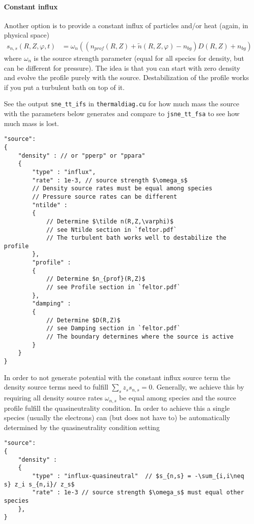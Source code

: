 \paragraph{Constant influx}
Another option is to provide a constant influx of particles and/or heat (again, in physical space)
\begin{align}
    s_{n,s}(R,Z,\varphi, t) &= \omega_n \left( (n_{prof}(R,Z) + \tilde n(R,Z,\varphi) - n_{bg})D(R,Z) + n_{bg}\right)
\end{align}
where $\omega_n$ is the source strength parameter (equal for all species for density, but can be different for pressure).
The idea is that you can start with zero density and evolve the profile purely
with the source. Destabilization of the profile works if you put a turbulent
bath on top of it.
\begin{tcolorbox}[title=Note]
    See the output \texttt{sne_tt_ifs} in \texttt{thermaldiag.cu} for how much mass
the source with the parameters below generates and compare to
\texttt{jsne_tt_fsa} to see how much mass is lost.
\end{tcolorbox}
\begin{verbatim}
"source":
{
    "density" : // or "pperp" or "ppara"
    {
        "type" : "influx",
        "rate" : 1e-3, // source strength $\omega_s$
        // Density source rates must be equal among species
        // Pressure source rates can be different
        "ntilde" :
        {
            // Determine $\tilde n(R,Z,\varphi)$
            // see Ntilde section in `feltor.pdf`
            // The turbulent bath works well to destabilize the profile
        },
        "profile" :
        {
            // Determine $n_{prof}(R,Z)$
            // see Profile section in `feltor.pdf`
        },
        "damping" :
        {
            // Determine $D(R,Z)$
            // see Damping section in `feltor.pdf`
            // The boundary determines where the source is active
        }
    }
}
\end{verbatim}

In order to not generate potential with the constant influx source term the density source
terms need to fulfill $\sum_s z_s s_{n,s}  = 0$. Generally, we achieve this by
requiring all density source rates $\omega_{n,s}$ be equal among species and the source
profile fulfill the quasineutrality condition.
In order to achieve this a single species (usually the electrons) can (but does
not have to) be automatically determined by the quasineutrality condition setting
\begin{verbatim}
"source":
{
    "density" :
    {
        "type" : "influx-quasineutral"  // $s_{n,s} = -\sum_{i,i\neq s} z_i s_{n,i}/ z_s$
        "rate" : 1e-3 // source strength $\omega_s$ must equal other species
    },
}
\end{verbatim}

